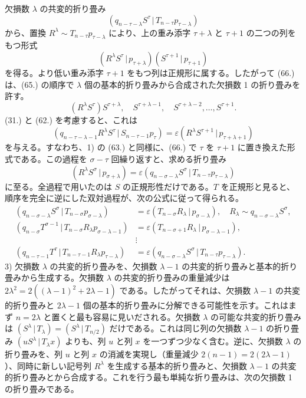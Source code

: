 \documentclass[11pt]{article}
\newcommand{\pair}[2]{(#1\,|\,#2)}
\newcommand{\eps}{\varepsilon}
\begin{document}
欠損数 $\lambda$ の共変的折り畳み
\[
 \pair{q_{n-\tau-\lambda}S^\tau}{T_{n-\tau}p_{\tau-\lambda}}
\]
から、置換 $R^\lambda\sim T_{n-\tau}p_{\tau-\lambda}$ により、上の重み添字 $\tau+\lambda$ と $\tau+1$ の二つの列をもつ形式
\begin{equation}
 \pair{R^\lambda S^\tau}{p_{\tau+\lambda}}\pair{S^{\tau+1}}{p_{\tau+1}}
\tag{66}
\end{equation}
を得る。より低い重み添字 $\tau+1$ をもつ列は正規形に属する。したがって (66.) は、(65.) の順序で $\lambda$ 個の基本的折り畳みから合成された欠損数 1 の折り畳みを許す。
\[
 (R^\lambda S^\tau)S^{\tau+\lambda},\quad S^{\tau+\lambda-1},\quad S^{\tau+\lambda-2},\ldots,S^{\tau+1}.
\]
(31.) と (62.) を考慮すると、これは
\[
 \pair{q_{n-\tau-\lambda-1}R^\lambda S^\tau}{S_{n-\tau-1}p_\tau}=\eps\pair{R^\lambda S^{\tau+1}}{p_{\tau+\lambda+1}}
\]
を与える。すなわち、1) の (63.) と同様に、(66.) で $\tau$ を $\tau+1$ に置き換えた形式である。この過程を $\sigma-\tau$ 回繰り返すと、求める折り畳み
\[
 \pair{R^\lambda S^\sigma}{p_{\sigma+\lambda}}=\eps\pair{q_{n-\sigma-\lambda}S^\sigma}{T_{n-\tau}p_{\tau-\lambda}}
\]
に至る。全過程で用いたのは $S$ の正規形性だけである。$T$ を正規形と見ると、順序を完全に逆にした双対過程が、次の公式に従って得られる。
\begin{align*}
\pair{q_{n-\sigma-\lambda}S^\sigma}{T_{n-\sigma}p_{\sigma-\lambda}}&=\eps\pair{T_{n-\sigma}R_\lambda}{p_{\sigma-\lambda}},\quad R_\lambda\sim q_{n-\sigma-\lambda}S^\sigma,\\
\pair{q_{n-\sigma}T^{\sigma-1}}{T_{n-\sigma}R_\lambda p_{\sigma-\lambda-1}}&=\eps\pair{T_{n-\sigma+1}R_\lambda}{p_{\sigma-\lambda-1}},\\
&\vdots\\
\pair{q_{n-\tau-1}T^\tau}{T_{n-\tau-1}R_\lambda p_{\tau-\lambda}}&=\eps\pair{q_{n-\sigma-\lambda}S^\sigma}{T_{n-\tau}p_{\tau-\lambda}}.
\end{align*}
3) 欠損数 $\lambda$ の共変的折り畳みを、欠損数 $\lambda-1$ の共変的折り畳みと基本的折り畳みから生成する。欠損数 $\lambda$ の共変的折り畳みの重量減少は $2\lambda^2=2((\lambda-1)^2+2\lambda-1)$ である。したがってそれは、欠損数 $\lambda-1$ の共変的折り畳みと $2\lambda-1$ 個の基本的折り畳みに分解できる可能性を示す。これはまず $n=2\lambda$ と置くと最も容易に見いだされる。欠損数 $\lambda$ の可能な共変的折り畳みは $\pair{S^\lambda}{T_\lambda}=\pair{S^\lambda}{T_{n/2}}$ だけである。これは同じ列の欠損数 $\lambda-1$ の折り畳み $\pair{uS^\lambda}{T_\lambda x}$ よりも、列 $u$ と列 $x$ を一つずつ少なく含む。逆に、欠損数 $\lambda$ の折り畳みを、列 $u$ と列 $x$ の消滅を実現し（重量減少 $2(n-1)=2(2\lambda-1)$）、同時に新しい記号列 $R^\lambda$ を生成する基本的折り畳みと、欠損数 $\lambda-1$ の共変的折り畳みとから合成する。これを行う最も単純な折り畳みは、次の欠損数 1 の折り畳みである。
\end{document}
